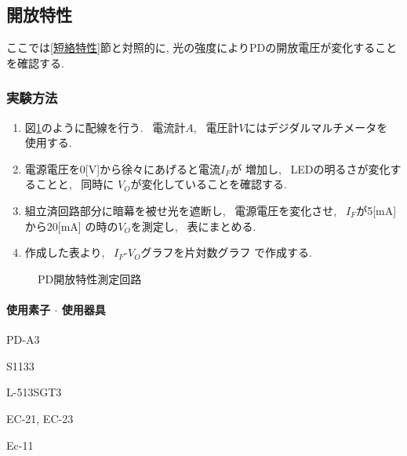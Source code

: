 \documentclass[titlepage]{jsarticle}
\begin{document}
    \subsection{開放特性}
        ここでは\ref{短絡特性}節と対照的に,
        光の強度によりPDの開放電圧が変化することを確認する.
            
        \subsubsection{実験方法}
            \begin{enumerate}
                \item 図\ref{fig:開放特性回路}のように配線を行う.
                    ~電流計$A$, ~電圧計$V$にはデジダルマルチメータを
                    使用する.
                \item 電源電圧を0[V]から徐々にあげると電流$I_F$が
                    増加し, ~LEDの明るさが変化することと, ~同時に
                    $V_O$が変化していることを確認する.
                \item 組立済回路部分に暗幕を被せ光を遮断し,
                    ~電源電圧を変化させ, ~$I_F$が5[mA]から20[mA]
                    の時の$V_O$を測定し, ~表にまとめる.
                \item 作成した表より, ~$I_F$-$V_O$グラフを片対数グラフ
                    で作成する.
            \end{enumerate}

            \begin{figure}[ht]
                \centering
                \caption{PD開放特性測定回路}
                \label{fig:開放特性回路}
            \end{figure}
            
            \paragraph{使用素子 $\cdot$ 使用器具}
                \begin{description}
                    \setlength{\leftskip}{1.5em}
                    \item[組立済回路] PD-A3
                    \item[PD] S1133
                    \item[LED] L-513SGT3
                    \item[デジタルマルチメータ] EC-21, EC-23
                    \item[直流電源] Ec-11
                \end{description}
\end{document}
